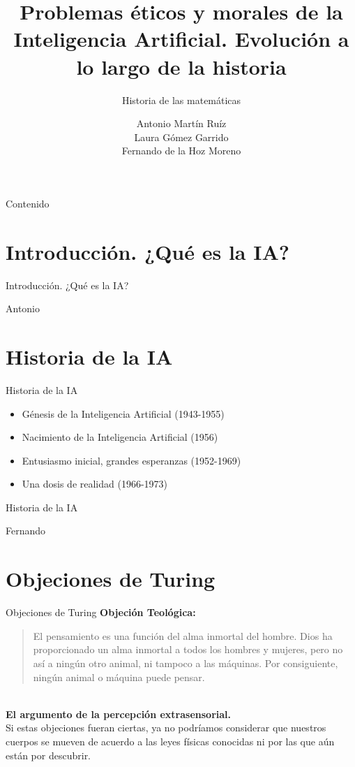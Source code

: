 \documentclass{beamer}
\title{Problemas éticos y morales de la
Inteligencia Artificial. Evolución a lo largo de la historia}
\subtitle{Historia de las matemáticas}
\author{Antonio Martín Ruíz \\ Laura Gómez Garrido \\ Fernando de la Hoz Moreno  }
\begin{document}
\begin{frame}
\titlepage
\end{frame}
\begin{frame}{Contenido}
  \tableofcontents
\end{frame}
\section{Introducción. ¿Qué es la IA?}

\begin{frame}{Introducción. ¿Qué es la IA?}

Antonio

\end{frame}

\section{Historia de la IA}

\begin{frame}{Historia de la IA}
\begin{itemize}
\item Génesis de la Inteligencia Artificial (1943-1955)
\item Nacimiento de la Inteligencia Artificial (1956)
\item Entusiasmo inicial, grandes esperanzas (1952-1969)
\item Una dosis de realidad (1966-1973)
\end{itemize}
\end{frame}

\begin{frame}{Historia de la IA}

Fernando

\end{frame}

\section{Objeciones de Turing}
\begin{frame}{Objeciones de Turing}
\textbf{Objeción Teológica:}
\begin{quote}\small El pensamiento es una función del alma inmortal del hombre. Dios ha proporcionado un alma inmortal a todos los hombres y mujeres, pero no así a ningún otro animal, ni tampoco a las máquinas. Por consiguiente, ningún animal o máquina puede pensar.\end{quote}\\
\vspace{8mm}
\textbf{El argumento de la percepción extrasensorial.}\\
Si estas objeciones fueran ciertas, ya no podríamos considerar que nuestros cuerpos se mueven de acuerdo a las leyes físicas conocidas ni por las que aún están por descubrir.
\end{frame}
\end{document}
